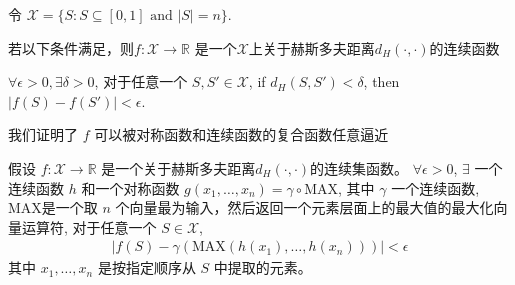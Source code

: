 令 $\mathcal{X}=\{S: S\subseteq [0,1]\mbox{ and } |S|=n \}$. 

若以下条件满足，则$f:\mathcal{X}\rightarrow \mathbb{R}$ 是一个$\mathcal{X}$上关于赫斯多夫距离$d_H(\cdot, \cdot)$的连续函数

$\forall \epsilon > 0, \exists \delta >0$, 对于任意一个 $S, S'\in\mathcal{X}$, if $d_H(S, S') < \delta$, then $|f(S)-f(S')|< \epsilon$.

我们证明了 $f$ 可以被对称函数和连续函数的复合函数任意逼近

\begin{customthm}{1}
假设 $f:\mathcal{X}\rightarrow \mathbb{R}$ 是一个关于赫斯多夫距离$d_H(\cdot, \cdot)$的连续集函数。 $\forall \epsilon > 0$, $\exists$ 一个连续函数 $h$ 和一个对称函数 $g(x_1, \dots, x_n)=\gamma \circ \mbox{MAX}$, 其中 $\gamma$ 一个连续函数, $\mbox{MAX}$是一个取 $n$ 个向量最为输入，然后返回一个元素层面上的最大值的最大化向量运算符, 对于任意一个 $S\in\mathcal{X}$,
\begin{align*}
	|f(S) - \gamma(\mbox{MAX}(h(x_1), \ldots, h(x_n)))| < \epsilon
\end{align*}
其中 $x_1, \ldots, x_n$ 是按指定顺序从 $S$ 中提取的元素。
\end{customthm}

